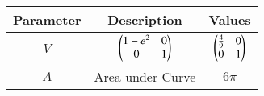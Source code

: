 \begin{tabular}[12pt]{|c|c|c|}
    \hline
    Parameter & Description & Values\\ 
    \hline
    $V$ & $\begin{pmatrix} 1-e^{2} & 0 \\ 0 & 1 \end{pmatrix}$ & $\begin{pmatrix}\frac{4}{9} & 0 \\ 0 & 1 \end{pmatrix}$ \\
    \hline
    $A$ & Area under Curve & $6\pi$ \\ 
    \hline
    \end{tabular}